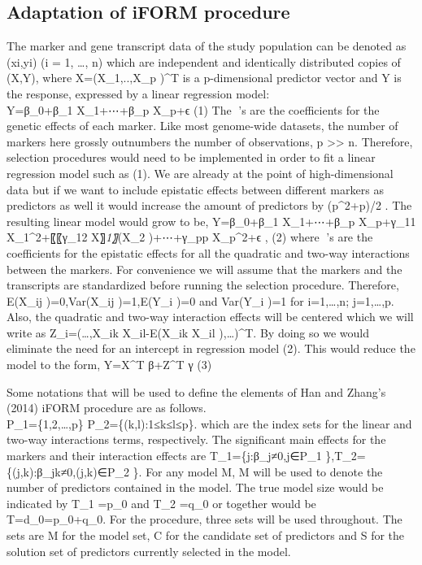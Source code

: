 \documentclass[]{book}
\theoremstyle{definition}
\theoremstyle{definition}
\theoremstyle{remark}
\begin{document}
\subsection{Adaptation of iFORM
procedure}\label{adaptation-of-iform-procedure}

The marker and gene transcript data of the study population can be
denoted as (xi,yi) (i = 1, \ldots{}, n) which are independent and
identically distributed copies of (X,Y), where X=(X\_1,..,X\_p )\^{}T is
a p-dimensional predictor vector and Y is the response, expressed by a
linear regression model:\\
Y=β\_0+β\_1 X\_1+⋯+β\_p X\_p+ϵ (1) The 's are the coefficients for the
genetic effects of each marker. Like most genome-wide datasets, the
number of markers here grossly outnumbers the number of observations, p
\textgreater{}\textgreater{} n. Therefore, selection procedures would
need to be implemented in order to fit a linear regression model such as
(1). We are already at the point of high-dimensional data but if we want
to include epistatic effects between different markers as predictors as
well it would increase the amount of predictors by (p\^{}2+p)/2 . The
resulting linear model would grow to be, Y=β\_0+β\_1 X\_1+⋯+β\_p
X\_p+γ\_11 X\_1\^{}2+〖〖γ\_12 X〗\emph{1〗}(X\_2 )+⋯+γ\_pp X\_p\^{}2+ϵ
, (2) where 's are the coefficients for the epistatic effects for all
the quadratic and two-way interactions between the markers. For
convenience we will assume that the markers and the transcripts are
standardized before running the selection procedure. Therefore, E(X\_ij
)=0,Var(X\_ij )=1,E(Y\_i )=0 and Var(Y\_i )=1 for i=1,\ldots{},n;
j=1,\ldots{},p. Also, the quadratic and two-way interaction effects will
be centered which we will write as Z\_i=(\ldots{},X\_ik X\_il-E(X\_ik
X\_il ),\ldots{})\^{}T. By doing so we would eliminate the need for an
intercept in regression model (2). This would reduce the model to the
form, Y=X\^{}T β+Z\^{}T γ (3)

Some notations that will be used to define the elements of Han and
Zhang's (2014) iFORM procedure are as follows.\\
P\_1=\{1,2,\ldots{},p\} P\_2=\{(k,l):1≤k≤l≤p\}. which are the index sets
for the linear and two-way interactions terms, respectively. The
significant main effects for the markers and their interaction effects
are T\_1=\{j:β\_j≠0,j∈P\_1 \},T\_2=\{(j,k):β\_jk≠0,(j,k)∈P\_2 \}. For
any model M, \textbar{}M\textbar{} will be used to denote the number of
predictors contained in the model. The true model size would be
indicated by \textbar{}T\_1 \textbar{}=p\_0 and \textbar{}T\_2
\textbar{}=q\_0 or together would be
\textbar{}T\textbar{}=d\_0=p\_0+q\_0. For the procedure, three sets will
be used throughout. The sets are M for the model set, C for the
candidate set of predictors and S for the solution set of predictors
currently selected in the model.
\end{document}
